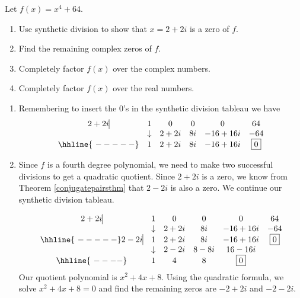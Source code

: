\documentclass{ximera}
\begin{document}
\begin{example}  Let $f(x) = x^4+64$.  
\begin{enumerate}
\item  Use synthetic division to show that $x=2+2i$ is a zero of $f$.
\item  Find the remaining complex zeros of $f$.
\item  Completely factor $f(x)$ over the complex numbers.
\item  Completely factor $f(x)$ over the real numbers.
\end{enumerate}
\end{example}

\begin{exampleSol}
    \begin{enumerate}
        \item  Remembering to insert the $0$'s in the synthetic division tableau we have
            \[ 
            \begin{array}{cccccc}
                2+2i   \vline& 1 & 0 & 0  & 0 & 64 \\
                & \downarrow     &  2+2i  &  8i & -16+16i & -64\\ \hhline{~-----} 
                & 1 &  2+2i  & 8i & -16+16i &  \fbox{$0$}  \\ 
            \end{array}
            \]
        
        \item  Since $f$ is a fourth degree polynomial, we need to make two successful divisions to get a quadratic quotient.  Since $2+2i$ is a zero, we know from Theorem \ref{conjugatepairsthm} that $2-2i$ is also a zero.  We continue our synthetic division tableau.
            
            \[ 
            \begin{array}{cccccc}
                2+2i   \vline& 1 & 0 & 0  & 0 & 64 \\
                & \downarrow     &  2+2i  &  8i & -16+16i & -64\\ \hhline{~-----} 
                2-2i   \vline  & 1 &  2+2i  & 8i & -16+16i &  \fbox{$0$}  \\
                & \downarrow &  2-2i  &  8-8i  & 16-16i &\\ \hhline{~----} 
                & 1  &  4  & 8& \fbox{0} &   \\
            \end{array}
            \]
            Our quotient polynomial is $x^2+4x+8$.  Using the quadratic formula, we solve $x^2+4x+8 = 0$ and find the remaining zeros are $-2+2i$ and $-2-2i$.  
        

\end{enumerate}
\end{exampleSol}
\end{document}
